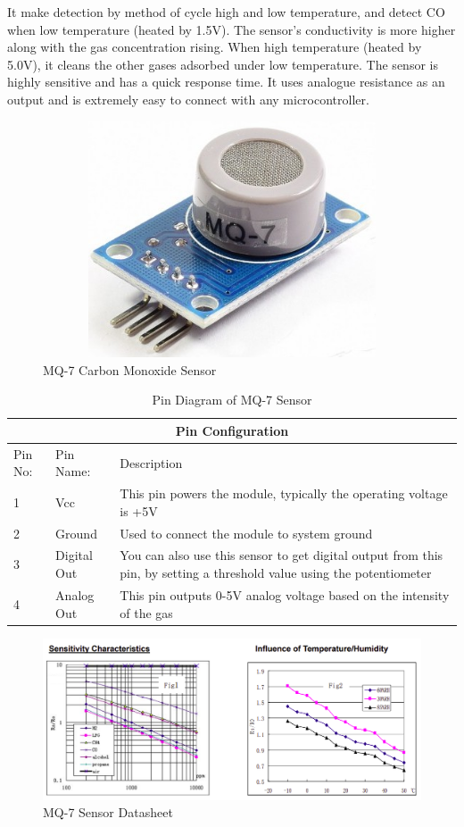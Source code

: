  It make detection by method of cycle high and low temperature, and detect CO when low temperature (heated by 1.5V). The sensor’s conductivity is more higher along with the gas concentration rising. When high temperature (heated by 5.0V), it cleans the other gases adsorbed under low temperature. The sensor is highly sensitive and has a quick response time. It uses analogue resistance as an output and is extremely easy to connect with any microcontroller.
 \begin{figure}[!ht]
\centering
\includegraphics[width=12cm,height=7cm]{figures/mq-7.jpg}
\caption{\label{img39} MQ-7 Carbon Monoxide Sensor}
\end{figure} 
 
 \begin{table}[!ht]
\centering
\begin{tabular}{ |p{1cm}|p{2cm}|p{8cm}|  }
\hline
\multicolumn{3}{|c|}{Pin Configuration} \\
\hline
Pin No: & Pin Name: & Description \\
\hline
1 & Vcc  & This pin powers the module, typically the operating voltage is +5V\\
2 & Ground & Used to connect the module to system ground\\
3 & Digital Out & You can also use this sensor to get digital output from this pin, by setting a threshold value using the potentiometer\\
4 & Analog Out & This pin outputs 0-5V analog voltage based on the intensity of the gas \\
\hline
\end{tabular}
\caption{\label{mq-7pin}Pin Diagram of MQ-7 Sensor}
\end{table}
 
 
 
\begin{figure}[!ht]
\centering
\includegraphics[width=\linewidth]{figures/mq7-datasheet.png}
\caption{\label{img310} MQ-7 Sensor Datasheet}
\end{figure}

